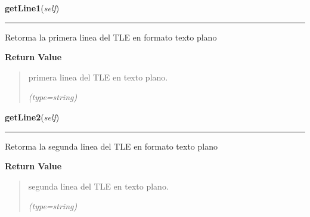     \label{GroundSegment:models:Tle:Tle:getLine1}

    \vspace{0.5ex}

\hspace{.8\funcindent}\begin{boxedminipage}{\funcwidth}

    \raggedright \textbf{getLine1}(\textit{self})

    \vspace{-1.5ex}

    \rule{\textwidth}{0.5\fboxrule}
\setlength{\parskip}{2ex}
    Retorma la primera linea del TLE en formato texto plano

\setlength{\parskip}{1ex}
      \textbf{Return Value}
    \vspace{-1ex}

      \begin{quote}
      primera linea del TLE en texto plano.

      {\it (type=string)}

      \end{quote}

    \end{boxedminipage}

    \label{GroundSegment:models:Tle:Tle:getLine2}

    \vspace{0.5ex}

\hspace{.8\funcindent}\begin{boxedminipage}{\funcwidth}

    \raggedright \textbf{getLine2}(\textit{self})

    \vspace{-1.5ex}

    \rule{\textwidth}{0.5\fboxrule}
\setlength{\parskip}{2ex}
    Retorma la segunda linea del TLE en formato texto plano

\setlength{\parskip}{1ex}
      \textbf{Return Value}
    \vspace{-1ex}

      \begin{quote}
      segunda linea del TLE en texto plano.

      {\it (type=string)}

      \end{quote}

    \end{boxedminipage}


